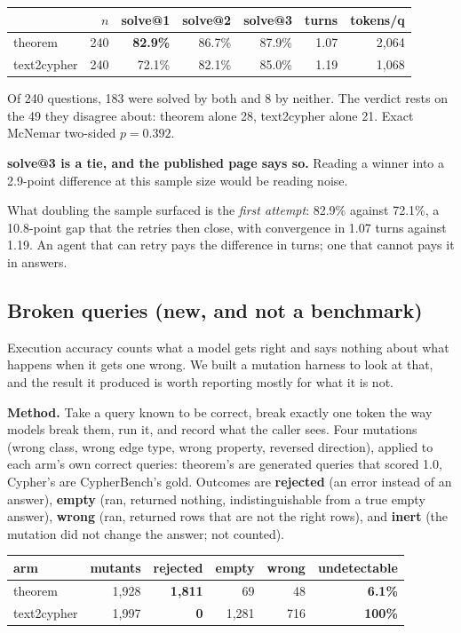 \documentclass[11pt]{article}
\begin{document}
\begin{center}
\begin{tabular}{lrrrrrr}
\toprule
 & $n$ & solve@1 & solve@2 & solve@3 & turns & tokens/q \\
\midrule
theorem     & 240 & \textbf{82.9\%} & 86.7\% & 87.9\% & 1.07 & 2{,}064 \\
text2cypher & 240 & 72.1\% & 82.1\% & 85.0\% & 1.19 & 1{,}068 \\
\bottomrule
\end{tabular}
\end{center}

Of 240 questions, 183 were solved by both and 8 by neither. The verdict rests on
the 49 they disagree about: theorem alone 28, text2cypher alone 21. Exact
McNemar two-sided $p = 0.392$.

\textbf{solve@3 is a tie, and the published page says so.} Reading a winner into
a 2.9-point difference at this sample size would be reading noise.

What doubling the sample surfaced is the \emph{first attempt}: 82.9\% against
72.1\%, a 10.8-point gap that the retries then close, with convergence in 1.07
turns against 1.19. An agent that can retry pays the difference in turns; one
that cannot pays it in answers.

\subsection{Broken queries (new, and not a benchmark)}

Execution accuracy counts what a model gets right and says nothing about what
happens when it gets one wrong. We built a mutation harness to look at that, and
the result it produced is worth reporting mostly for what it is not.

\textbf{Method.} Take a query known to be correct, break exactly one token the
way models break them, run it, and record what the caller sees. Four mutations
(wrong class, wrong edge type, wrong property, reversed direction), applied to
each arm's own correct queries: theorem's are generated queries that scored 1.0,
Cypher's are CypherBench's gold. Outcomes are \textbf{rejected} (an error instead
of an answer), \textbf{empty} (ran, returned nothing, indistinguishable from a
true empty answer), \textbf{wrong} (ran, returned rows that are not the right
rows), and \textbf{inert} (the mutation did not change the answer; not counted).

\begin{center}
\begin{tabular}{lrrrrr}
\toprule
arm & mutants & rejected & empty & wrong & undetectable \\
\midrule
theorem     & 1{,}928 & \textbf{1{,}811} & 69 & 48 & \textbf{6.1\%} \\
text2cypher & 1{,}997 & \textbf{0} & 1{,}281 & 716 & \textbf{100\%} \\
\bottomrule
\end{tabular}
\end{center}
\end{document}
